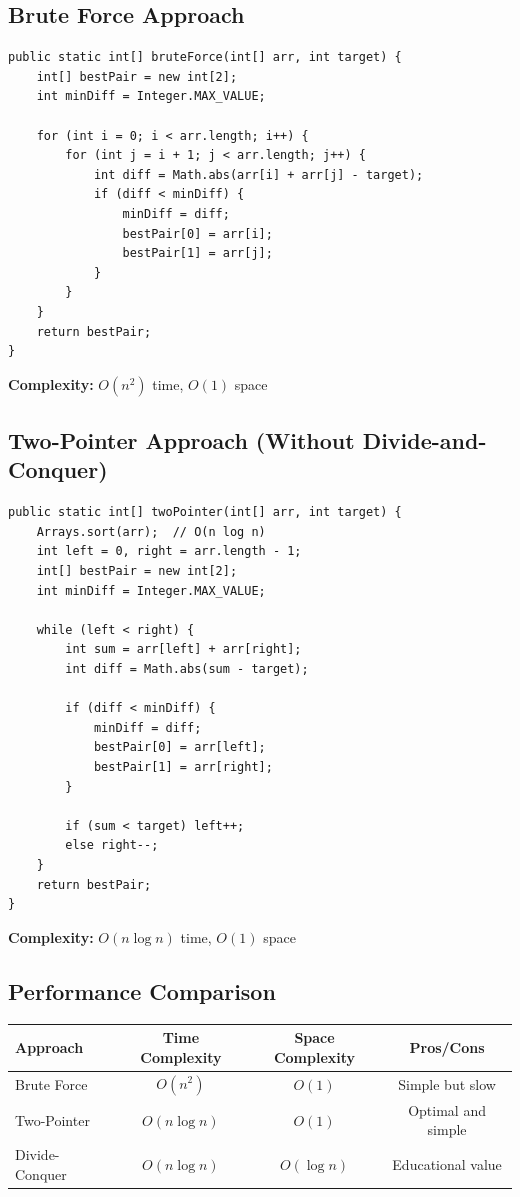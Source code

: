 \documentclass[12pt,a4paper]{article}
\begin{document}
\subsection{Brute Force Approach}

\begin{lstlisting}[caption=Brute Force Solution]
public static int[] bruteForce(int[] arr, int target) {
    int[] bestPair = new int[2];
    int minDiff = Integer.MAX_VALUE;
    
    for (int i = 0; i < arr.length; i++) {
        for (int j = i + 1; j < arr.length; j++) {
            int diff = Math.abs(arr[i] + arr[j] - target);
            if (diff < minDiff) {
                minDiff = diff;
                bestPair[0] = arr[i];
                bestPair[1] = arr[j];
            }
        }
    }
    return bestPair;
}
\end{lstlisting}

\textbf{Complexity:} $O(n^2)$ time, $O(1)$ space

\subsection{Two-Pointer Approach (Without Divide-and-Conquer)}

\begin{lstlisting}[caption=Simple Two-Pointer Solution]
public static int[] twoPointer(int[] arr, int target) {
    Arrays.sort(arr);  // O(n log n)
    int left = 0, right = arr.length - 1;
    int[] bestPair = new int[2];
    int minDiff = Integer.MAX_VALUE;
    
    while (left < right) {
        int sum = arr[left] + arr[right];
        int diff = Math.abs(sum - target);
        
        if (diff < minDiff) {
            minDiff = diff;
            bestPair[0] = arr[left];
            bestPair[1] = arr[right];
        }
        
        if (sum < target) left++;
        else right--;
    }
    return bestPair;
}
\end{lstlisting}

\textbf{Complexity:} $O(n \log n)$ time, $O(1)$ space

\subsection{Performance Comparison}

\begin{center}
\renewcommand{\arraystretch}{1.5}
\begin{tabular}{|l|c|c|c|}
\hline
\textbf{Approach} & \textbf{Time Complexity} & \textbf{Space Complexity} & \textbf{Pros/Cons} \\
\hline
Brute Force & $O(n^2)$ & $O(1)$ & Simple but slow \\
Two-Pointer & $O(n \log n)$ & $O(1)$ & Optimal and simple \\
Divide-Conquer & $O(n \log n)$ & $O(\log n)$ & Educational value \\
\hline
\end{tabular}
\end{center}
\end{document}
